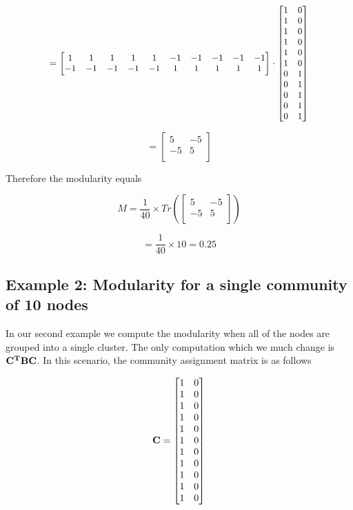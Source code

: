 \documentclass[a4paper,12pt]{article}
\begin{document}
	\[\small =\begin{bmatrix}
		1&  1&  1&  1&  1& -1& -1& -1& -1& -1 \\
		-1& -1& -1& -1& -1&  1&  1&  1&  1&  1 \\
	\end{bmatrix} \cdot 
	\begin{bmatrix}
		1 & 0 \\ 
		1 & 0 \\
		1 & 0 \\
		1 & 0 \\ 
		1 & 0 \\ 
		1 & 0 \\ 
		0 & 1 \\ 
		0 & 1 \\ 
		0 & 1 \\ 
		0 & 1 \\ 
		0 & 1 
	\end{bmatrix}\]
	
	
	\[ =\begin{bmatrix}
		5 & -5 \\
		-5 & 5 \\
	\end{bmatrix} \]
	
	Therefore the modularity equals 
	
	\[ M = \frac{1}{40} \times Tr\left( \begin{bmatrix}
		5 & -5 \\
		-5 & 5 \\
	\end{bmatrix} \right) \]
	
	\[ = \frac{1}{40} \times 10 = 0.25\]
	
	
	\subsection*{Example 2: Modularity for a single community of 10 nodes}
	In our second example we compute the modularity when all of the nodes are grouped into a single cluster. The only computation which we much change is ${\bf C^T B C}$. In this scenario, the community assignment matrix is as follows
	
	\[ {\bf C} = \begin{bmatrix}1 & 0 \\ 1 & 0 \\ 1 & 0 \\ 1 & 0 \\ 1 & 0 \\ 1 & 0 \\ 1 & 0 \\ 1 & 0 \\ 1 & 0 \\ 1 & 0 \\ 1 & 0 \\
	\end{bmatrix}\] 
	
\end{document}
